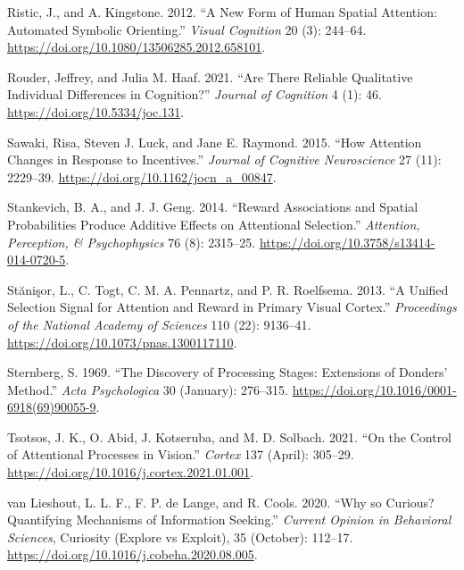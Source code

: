 \documentclass[11pt,halfline,a4paper,]{ouparticle}
\newlength{\cslhangindent}
\newenvironment{cslreferences}%
  {\setlength{\parindent}{0pt}%
  \everypar{\setlength{\hangindent}{\cslhangindent}}\ignorespaces}%
  {\par}
\begin{document}
\begin{cslreferences}
\leavevmode\hypertarget{ref-risticNewFormHuman2012}{}%
Ristic, J., and A. Kingstone. 2012. ``A New Form of Human Spatial Attention: Automated Symbolic Orienting.'' \emph{Visual Cognition} 20 (3): 244--64. \url{https://doi.org/10.1080/13506285.2012.658101}.

\leavevmode\hypertarget{ref-rouderAreThereReliable2021}{}%
Rouder, Jeffrey, and Julia M. Haaf. 2021. ``Are There Reliable Qualitative Individual Differences in Cognition?'' \emph{Journal of Cognition} 4 (1): 46. \url{https://doi.org/10.5334/joc.131}.

\leavevmode\hypertarget{ref-sawakiHowAttentionChanges2015}{}%
Sawaki, Risa, Steven J. Luck, and Jane E. Raymond. 2015. ``How Attention Changes in Response to Incentives.'' \emph{Journal of Cognitive Neuroscience} 27 (11): 2229--39. \url{https://doi.org/10.1162/jocn_a_00847}.

\leavevmode\hypertarget{ref-stankevichRewardAssociationsSpatial2014}{}%
Stankevich, B. A., and J. J. Geng. 2014. ``Reward Associations and Spatial Probabilities Produce Additive Effects on Attentional Selection.'' \emph{Attention, Perception, \& Psychophysics} 76 (8): 2315--25. \url{https://doi.org/10.3758/s13414-014-0720-5}.

\leavevmode\hypertarget{ref-stanisorUnifiedSelectionSignal2013a}{}%
Stănişor, L., C. Togt, C. M. A. Pennartz, and P. R. Roelfsema. 2013. ``A Unified Selection Signal for Attention and Reward in Primary Visual Cortex.'' \emph{Proceedings of the National Academy of Sciences} 110 (22): 9136--41. \url{https://doi.org/10.1073/pnas.1300117110}.

\leavevmode\hypertarget{ref-sternbergDiscoveryProcessingStages1969}{}%
Sternberg, S. 1969. ``The Discovery of Processing Stages: Extensions of Donders' Method.'' \emph{Acta Psychologica} 30 (January): 276--315. \url{https://doi.org/10.1016/0001-6918(69)90055-9}.

\leavevmode\hypertarget{ref-tsotsosControlAttentionalProcesses2021a}{}%
Tsotsos, J. K., O. Abid, J. Kotseruba, and M. D. Solbach. 2021. ``On the Control of Attentional Processes in Vision.'' \emph{Cortex} 137 (April): 305--29. \url{https://doi.org/10.1016/j.cortex.2021.01.001}.

\leavevmode\hypertarget{ref-vanlieshoutWhyCuriousQuantifying2020}{}%
van Lieshout, L. L. F., F. P. de Lange, and R. Cools. 2020. ``Why so Curious? Quantifying Mechanisms of Information Seeking.'' \emph{Current Opinion in Behavioral Sciences}, Curiosity (Explore vs Exploit), 35 (October): 112--17. \url{https://doi.org/10.1016/j.cobeha.2020.08.005}.


\end{cslreferences}
\end{document}
